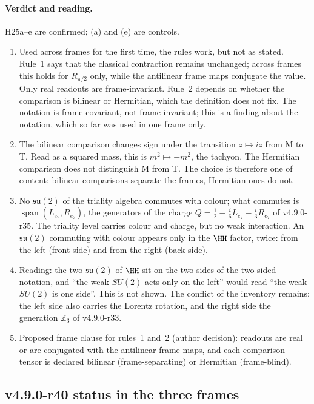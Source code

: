 \paragraph{Verdict and reading.}
H25a--e are confirmed; (a) and (e) are controls.
\begin{enumerate}[leftmargin=2em]
\item Used across frames for the first time, the rules work, but not as stated.  Rule~1 says that the classical contraction remains
unchanged; across frames this holds for \(R_{\pi/2}\) only, while the antilinear frame maps conjugate the value.  Only real readouts are
frame-invariant.  Rule~2 depends on whether the comparison is bilinear or Hermitian, which the definition does not fix.  The notation
is frame-covariant, not frame-invariant; this is a finding about the notation, which so far was used in one frame only.
\item The bilinear comparison changes sign under the transition \(z\mapsto iz\) from M to T.  Read as a squared mass, this is
\(m^2\mapsto-m^2\), the tachyon.  The Hermitian comparison does not distinguish M from T.  The choice is therefore one of content:
bilinear comparisons separate the frames, Hermitian ones do not.
\item No \(\mathfrak{su}(2)\) of the triality algebra commutes with colour; what commutes is \(\operatorname{span}(L_{e_7},R_{e_7})\), the
generators of the charge \(Q=\tfrac12-\tfrac{i}{6}L_{e_7}-\tfrac{i}{3}R_{e_7}\) of v4.9.0-r35.  The triality level carries colour and
charge, but no weak interaction.  An \(\mathfrak{su}(2)\) commuting with colour appears only in the \(\HH\) factor, twice: from the left
(front side) and from the right (back side).
\item Reading: the two \(\mathfrak{su}(2)\) of \(\HH\) sit on the two sides of the two-sided notation, and ``the weak \(SU(2)\) acts only
on the left'' would read ``the weak \(SU(2)\) is one side''.  This is not shown.  The conflict of the inventory remains: the left side
also carries the Lorentz rotation, and the right side the generation \(\mathbb Z_3\) of v4.9.0-r33.
\item Proposed frame clause for rules~1 and~2 (author decision): readouts are real or are conjugated with the antilinear frame maps,
and each comparison tensor is declared bilinear (frame-separating) or Hermitian (frame-blind).
\end{enumerate}

\subsection*{v4.9.0-r40 status in the three frames}
\label{subsec:v490-r40-frames}

